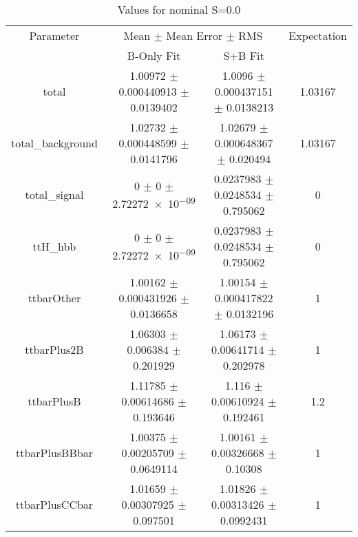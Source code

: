 \begin{table}
\centering
\caption{Values for nominal S=0.0}
\begin{tabular}{cccc}
\toprule
Parameter & \multicolumn{2}{c}{Mean $\pm$ Mean Error $\pm$ RMS} & Expectation\\
 & B-Only Fit & S+B Fit & \\
\midrule
total & \num{1.00972} $\pm$ \num{0.000440913} $\pm$ \num{0.0139402} & \num{1.0096} $\pm$ \num{0.000437151} $\pm$ \num{0.0138213} & \num{1.03167}\\
total\_background & \num{1.02732} $\pm$ \num{0.000448599} $\pm$ \num{0.0141796} & \num{1.02679} $\pm$ \num{0.000648367} $\pm$ \num{0.020494} & \num{1.03167}\\
total\_signal & \num{0} $\pm$ \num{0} $\pm$ \num{2.72272e-09} & \num{0.0237983} $\pm$ \num{0.0248534} $\pm$ \num{0.795062} & \num{0}\\
ttH\_hbb & \num{0} $\pm$ \num{0} $\pm$ \num{2.72272e-09} & \num{0.0237983} $\pm$ \num{0.0248534} $\pm$ \num{0.795062} & \num{0}\\
ttbarOther & \num{1.00162} $\pm$ \num{0.000431926} $\pm$ \num{0.0136658} & \num{1.00154} $\pm$ \num{0.000417822} $\pm$ \num{0.0132196} & \num{1}\\
ttbarPlus2B & \num{1.06303} $\pm$ \num{0.006384} $\pm$ \num{0.201929} & \num{1.06173} $\pm$ \num{0.00641714} $\pm$ \num{0.202978} & \num{1}\\
ttbarPlusB & \num{1.11785} $\pm$ \num{0.00614686} $\pm$ \num{0.193646} & \num{1.116} $\pm$ \num{0.00610924} $\pm$ \num{0.192461} & \num{1.2}\\
ttbarPlusBBbar & \num{1.00375} $\pm$ \num{0.00205709} $\pm$ \num{0.0649114} & \num{1.00161} $\pm$ \num{0.00326668} $\pm$ \num{0.10308} & \num{1}\\
ttbarPlusCCbar & \num{1.01659} $\pm$ \num{0.00307925} $\pm$ \num{0.097501} & \num{1.01826} $\pm$ \num{0.00313426} $\pm$ \num{0.0992431} & \num{1}\\
\bottomrule
\end{tabular}
\end{table}